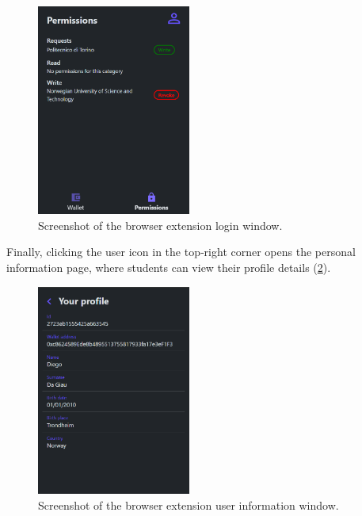 \begin{figure}
  \centering
  \includegraphics[width=0.45\textwidth]{figures/Permissions.png}
  \caption[Browser extension permissions page]{Screenshot of the browser extension login window.}
  \label{fig:permissionsExt}
\end{figure}

Finally, clicking the user icon in the top‐right corner opens the personal information page, where students can view their profile details (\cref{fig:userInfoExt}).

\begin{figure}
  \centering
  \includegraphics[width=0.45\textwidth]{figures/PersonalInfo.png}
  \caption[Browser extension user information page]{Screenshot of the browser extension user information window.}
  \label{fig:userInfoExt}
\end{figure}

